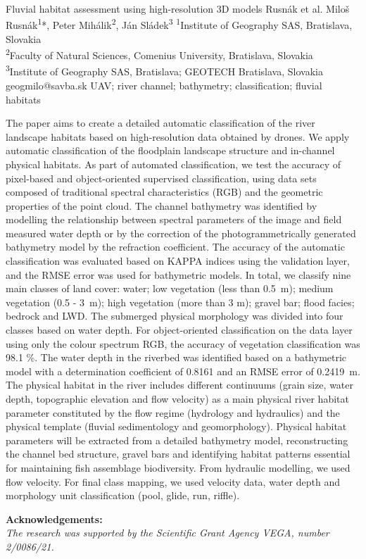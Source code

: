 \abstract
{Fluvial habitat assessment using high-resolution 3D models} %
{Rusnák et al.} %
{Miloš Rusnák\textsuperscript{1}*, Peter Mihálik\textsuperscript{2}, Ján Sládek\textsuperscript{3}} %
{\TLtag} %
{
\textsuperscript{1}Institute of Geography SAS, Bratislava, Slovakia\\
\textsuperscript{2}Faculty of Natural Sciences, Comenius University, Bratislava, Slovakia\\
\textsuperscript{3}Institute of Geography SAS, Bratislava; GEOTECH Bratislava, Slovakia
} %
{geogmilo@savba.sk}  %
{UAV; river channel; bathymetry; classification; fluvial habitats}%
{The paper aims to create a detailed automatic classification of the river landscape habitats based on high-resolution data obtained by drones. We apply automatic classification of the floodplain landscape structure and in-channel physical habitats. As part of automated classification, we test the accuracy of pixel-based and object-oriented supervised classification, using data sets composed of traditional spectral characteristics (RGB) and the geometric properties of the point cloud. The channel bathymetry was identified by modelling the relationship between spectral parameters of the image and field measured water depth or by the correction of the photogrammetrically generated bathymetry model by the refraction coefficient. The accuracy of the automatic classification was evaluated based on KAPPA indices using the validation layer, and the RMSE error was used for bathymetric models. In total, we classify nine main classes of land cover: water; low vegetation (less than 0.5~m); medium vegetation (0.5 - 3~m); high vegetation (more than 3 m); gravel bar; flood facies; bedrock and LWD. The submerged physical morphology was divided into four classes based on water depth. For object-oriented classification on the data layer using only the colour spectrum RGB, the accuracy of vegetation classification was 98.1 \%. The water depth in the riverbed was identified based on a bathymetric model with a determination coefficient of 0.8161 and an RMSE error of 0.2419~m. The physical habitat in the river includes different continuums (grain size, water depth, topographic elevation and flow velocity) as a main physical river habitat parameter constituted by the flow regime (hydrology and hydraulics) and the physical template (fluvial sedimentology and geomorphology). Physical habitat parameters will be extracted from a detailed bathymetry model, reconstructing the channel bed structure, gravel bars and identifying habitat patterns essential for maintaining fish assemblage biodiversity. From hydraulic modelling, we used flow velocity. For final class mapping, we used velocity data, water depth and morphology unit classification (pool, glide, run, riffle).
	
\vspace{0.5em}
\noindent
\textbf{Acknowledgements:}\\
\textit{The research was supported by the Scientific Grant Agency VEGA, number 2/0086/21.}
}%
{}%

